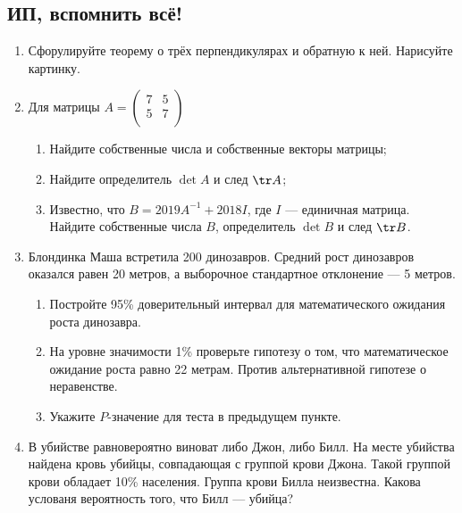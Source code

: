 
\subsection{ИП, вспомнить всё!}

\begin{enumerate}

    \item Сфорулируйте теорему о трёх перпендикулярах и обратную к ней. Нарисуйте картинку.
  
    \item Для матрицы
  $
    A=\begin{pmatrix}
    7 & 5  \\
    5 & 7  \\
    \end{pmatrix}
  $
  
    \begin{enumerate}
    \item Найдите собственные числа и собственные векторы матрицы;
    \item Найдите определитель $\det A$ и след $\tr A$;
   \item Известно, что $B = 2019A^{-1} + 2018I$, где $I$ — единичная матрица.
   Найдите собственные числа $B$, определитель $\det B$ и след $\tr B$.
  
    \end{enumerate}
  
  
    \item Блондинка Маша встретила 200 динозавров.
    Средний рост динозавров оказался равен 20 метров, а выборочное стандартное отклонение — 5 метров.
  
    \begin{enumerate}
      \item Постройте 95\% доверительный интервал для математического ожидания роста динозавра.
      \item На уровне значимости 1\% проверьте гипотезу о том, что математическое ожидание
      роста равно 22 метрам. Против альтернативной гипотезе о неравенстве.
      \item Укажите $P$-значение для теста в предыдущем пункте.
    \end{enumerate}
  
   \item В убийстве равновероятно виноват либо Джон, либо Билл. 
   На месте убийства найдена кровь убийцы, совпадающая с группой крови Джона. Такой группой крови обладает 10\% населения. Группа крови Билла неизвестна. 
   Какова услованя вероятность того, что Билл — убийца?
  
  \end{enumerate}
  

